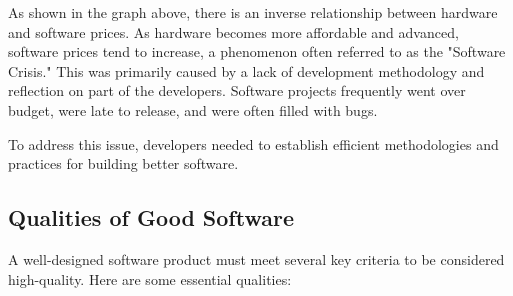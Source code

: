 \vspace{1.5cm}

As shown in the graph above, there is an inverse relationship between hardware and software prices. As hardware becomes more affordable and advanced, software prices tend to increase, a phenomenon often referred to as the "Software Crisis." This was primarily caused by a lack of development methodology and reflection on part of the developers. Software projects frequently went over budget, were late to release, and were often filled with bugs.

To address this issue, developers needed to establish efficient methodologies and practices for building better software.

\subsection{Qualities of Good Software}


A well-designed software product must meet several key criteria to be considered high-quality. Here are some essential qualities:

